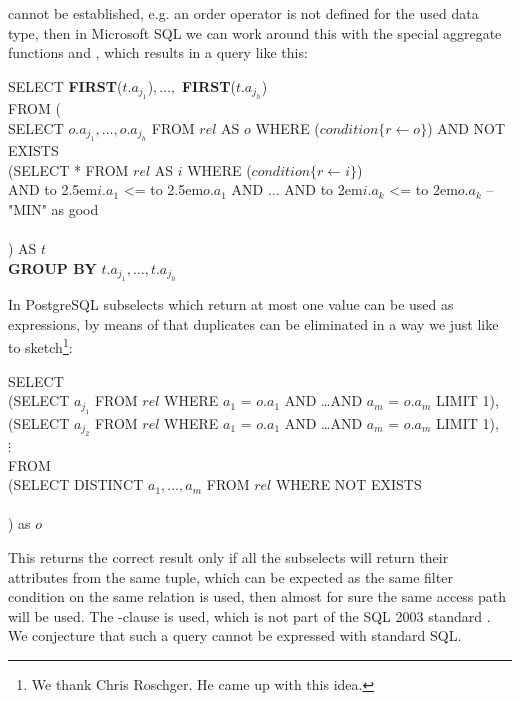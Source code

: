 cannot be established, e.g. an order operator is not defined for the
used data type, then in Microsoft SQL we can work around this with the
special aggregate functions  and ,
which results in a query like this:
%
\begin{sql}
\newcommand\abox[1]{\hbox to 2.5em{#1\hfil}}%
\newcommand\bbox[1]{\hbox to 2em{#1\hfil}}%
SELECT \textbf{FIRST}($t.a_{j_1}$)$, \ldots, $ \textbf{FIRST}($t.a_{j_h}$) \\
FROM (\\
SELECT $o.a_{j_1}, \ldots, o.a_{j_h}$ FROM $rel$ AS $o$ WHERE ($condition\{r \gets o\}$) AND NOT EXISTS \\
(SELECT * FROM $rel$ AS $i$ WHERE ($condition\{r \gets i\}$) \\
AND \abox{$i.a_1$} <= \abox{$o.a_1$} AND $\ldots$ AND \bbox{$i.a_k$} <= \bbox{$o.a_k$} -- "MIN" as good\\
 \\
) AS $t$ \\
\textbf{GROUP BY} $t.a_{j_1}, \ldots, t.a_{j_h}$
\end{sql}

In PostgreSQL subselects which return at most one value can be used as
expressions, by means of that duplicates can be eliminated in a way we
just like to sketch\footnote{We thank Chris Roschger.
He came up with this idea.}:

\begin{sql}
SELECT \\
(SELECT $a_{j_1}$ FROM $rel$ WHERE $a_1$ = $o.a_1$ AND \ldots AND $a_m$ = $o.a_m$ LIMIT 1), \\
(SELECT $a_{j_2}$ FROM $rel$ WHERE $a_1$ = $o.a_1$ AND \ldots AND $a_m$ = $o.a_m$ LIMIT 1), \\
$\vdots$ \\
FROM\\
(SELECT DISTINCT $a_1, \ldots, a_m$ FROM $rel$ WHERE NOT EXISTS\\
 \\
) as $o$
\end{sql}

This returns the correct result only if all the subselects will return
their attributes from the same tuple, which can be expected as the same
filter condition on the same relation is used, then almost for sure
the same access path will be used.  The -clause is
used, which is not part of the SQL 2003 standard \citep{SQL2003}. We conjecture that
such a query cannot be expressed with standard SQL.

